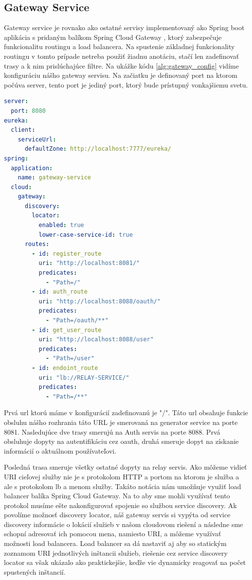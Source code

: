 \subsection{Gateway Service}  
Gateway service je rovnako ako ostatné servisy implementovaný ako Spring boot aplikácia s pridaným balíkom Spring Cloud Gateway \cite{cloud_gateway}, ktorý zabezpečuje funkcionalitu routingu a load balancera.  
Na spustenie základnej funkcionality routingu v tomto prípade netreba použiť žiadnu anotáciu, stačí len zadefinovať trasy a k nim prislúchajúce filtre. Na ukážke kódu \ref{alg:gateway_config} vidíme konfiguráciu nášho gateway servisu. Na začiatku je definovaný port na ktorom počúva server, tento port je jediný port, ktorý bude prístupný vonkajšiemu svetu. 


\begin{lstlisting}[float, caption={Konfigurácia Gateway servisu},label={alg:gateway_config},language=yaml]
server:
  port: 8080
eureka:
  client:
    serviceUrl:
      defaultZone: http://localhost:7777/eureka/
spring:
  application:
    name: gateway-service
  cloud:
    gateway:
      discovery:
        locator:
          enabled: true
          lower-case-service-id: true
      routes:
        - id: register_route
          uri: "http://localhost:8081/"
          predicates:
            - "Path=/"
        - id: auth_route
          uri: "http://localhost:8088/oauth/"
          predicates:
            - "Path=/oauth/**"
        - id: get_user_route
          uri: "http://localhost:8088/user"
          predicates:
            - "Path=/user"
        - id: endoint_route
          uri: "lb://RELAY-SERVICE/"
          predicates:
            - "Path=/**"
\end{lstlisting} 

Prvá \acrshort{url} ktorú máme v konfigurácií zadefinovanú je "/". Táto \acrshort{url} obsahuje funkcie obsluhu nášho rozhrania táto URL je smerovaná na generator service na porte 8081. 
Nasledujúce dve trasy smerujú na Auth servis na porte 8088. Prvá obsluhuje dopyty na autentifikáciu cez \acrshort{oauth}, druhá smeruje dopyt na získanie informácií o aktuálnom používateľovi. 

Posledná trasa smeruje všetky ostatné dopyty na relay servis. Ako môžeme vidieť URI cieľovej služby nie je s protokolom HTTP a portom na ktorom je služba a ale s protokolom lb a menom služby. Takáto notácia nám umožňuje využiť load balancer balíka Spring Cloud Gateway. Na to aby sme mohli využívať tento protokol musíme ešte nakonfigurovať spojenie so službou service discovery. Ak povolíme možnosť discovery locator, náš gateway servis si vypýta od service discovery informácie o lokácií služieb v našom cloudovom riešení a následne sme schopní adresovať ich pomocou mena, namiesto URI, a môžeme využívať možnosti load balancera. Load balancer sa dá nastaviť aj aby so statickým zoznamom URI jednotlivých inštancii služieb, riešenie cez service discovery locator sa však ukázalo ako praktickejšie, keďže vie dynamicky reagovať na počet spustených inštancií.   

